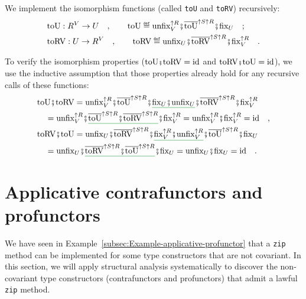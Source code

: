 We implement the isomorphism functions (called \lstinline!toU! and
\lstinline!toRV!) recursively:
\begin{align*}
 & \text{toU}:R^{V}\rightarrow U\quad,\quad\quad\text{toU}\triangleq\text{unfix}_{V}^{\uparrow R}\bef\overline{\text{toU}}^{\uparrow S\uparrow R}\bef\text{fix}_{U}\quad;\\
 & \text{toRV}:U\rightarrow R^{V}\quad,\quad\quad\text{toRV}\triangleq\text{unfix}_{U}\bef\overline{\text{toRV}}^{\uparrow S\uparrow R}\bef\text{fix}_{V}^{\uparrow R}\quad.
\end{align*}

To verify the isomorphism properties ($\text{toU}\bef\text{toRV}=\text{id}$
and $\text{toRV}\bef\text{toU}=\text{id}$), we use the inductive
assumption that those properties already hold for any recursive calls
of these functions:
\begin{align*}
 & \text{toU}\bef\text{toRV}=\text{unfix}_{V}^{\uparrow R}\bef\overline{\text{toU}}^{\uparrow S\uparrow R}\bef\gunderline{\text{fix}_{U}\bef\text{unfix}_{U}}\bef\overline{\text{toRV}}^{\uparrow S\uparrow R}\bef\text{fix}_{V}^{\uparrow R}\\
 & \quad=\text{unfix}_{V}^{\uparrow R}\bef\gunderline{\overline{\text{toU}}^{\uparrow S\uparrow R}\bef\overline{\text{toRV}}^{\uparrow S\uparrow R}}\bef\text{fix}_{V}^{\uparrow R}=\text{unfix}_{V}^{\uparrow R}\bef\text{fix}_{V}^{\uparrow R}=\text{id}\quad,\\
 & \text{toRV}\bef\text{toU}=\text{unfix}_{U}\bef\overline{\text{toRV}}^{\uparrow S\uparrow R}\bef\gunderline{\text{fix}_{V}^{\uparrow R}\bef\text{unfix}_{V}^{\uparrow R}}\bef\overline{\text{toU}}^{\uparrow S\uparrow R}\bef\text{fix}_{U}\\
 & \quad=\text{unfix}_{U}\bef\gunderline{\overline{\text{toRV}}^{\uparrow S\uparrow R}\bef\overline{\text{toU}}^{\uparrow S\uparrow R}}\bef\text{fix}_{U}=\text{unfix}_{U}\bef\text{fix}_{U}=\text{id}\quad.
\end{align*}


\section{Applicative contrafunctors and profunctors\label{sec:Applicative-contrafunctors-and-profunctors}}

We have seen in Example~\ref{subsec:Example-applicative-profunctor}
that a \lstinline!zip! method can be implemented for some type constructors
that are not covariant. In this section, we will apply structural
analysis systematically to discover the non-covariant type constructors
(contrafunctors and profunctors) that admit a lawful \lstinline!zip!
method.

